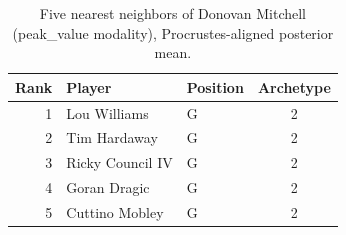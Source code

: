 \begin{table}[htbp]
  \centering\small
  \begin{tabular}{rllc}
    \toprule
    Rank & Player & Position & Archetype \\
    \midrule
    1 & Lou Williams & G & 2 \\
    2 & Tim Hardaway & G & 2 \\
    3 & Ricky Council IV & G & 2 \\
    4 & Goran Dragic & G & 2 \\
    5 & Cuttino Mobley & G & 2 \\
    \bottomrule
  \end{tabular}
  \caption{Five nearest neighbors of Donovan Mitchell (peak_value modality), Procrustes-aligned posterior mean.}
  \label{tab:Donovan_Mitchell_neighbors_peak_value}
\end{table}

